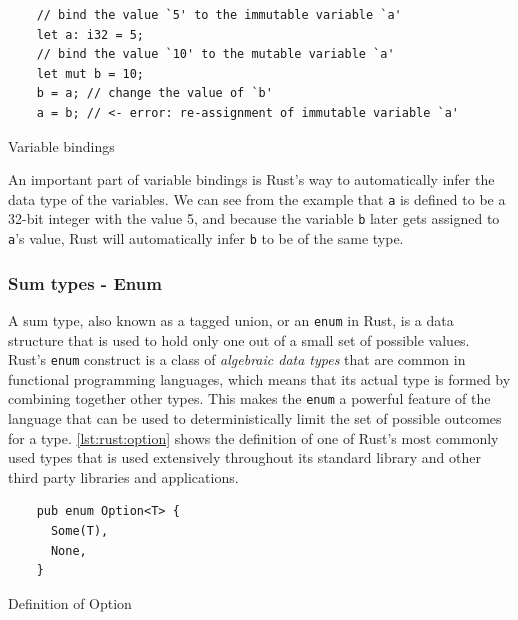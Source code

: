 \begin{listing}[H]
  \begin{verbatim}
    // bind the value `5' to the immutable variable `a'
    let a: i32 = 5;
    // bind the value `10' to the mutable variable `a'
    let mut b = 10;
    b = a; // change the value of `b'
    a = b; // <- error: re-assignment of immutable variable `a'
  \end{verbatim}
  \caption{Variable bindings}
  \label{lst:rust_variable_bindings}
\end{listing}

An important part of variable bindings is Rust's way to automatically infer the data type of the variables.
We can see from the example that \texttt{a} is defined to be a 32-bit integer with the value 5, and because the variable \texttt{b} later gets assigned to \texttt{a}'s value, Rust will automatically infer \texttt{b} to be of the same type.

\subsubsection{Sum types - Enum}

A sum type, also known as a tagged union, or an \texttt{enum} in Rust, is a data structure that is used to hold only one out of a small set of possible values.
Rust's \texttt{enum} construct is a class of \emph{algebraic data types} that are common in functional programming languages, which means that its actual type is formed by combining together other types.
This makes the \texttt{enum} a powerful feature of the language that can be used to deterministically limit the set of possible outcomes for a type.
\autoref{lst:rust:option} shows the definition of one of Rust's most commonly used types that is used extensively throughout its standard library and other third party libraries and applications.

\begin{listing}[H]
  \begin{verbatim}
    pub enum Option<T> {
      Some(T),
      None,
    }
  \end{verbatim}
  \caption{Definition of Option}
  \label{lst:rust:option}
\end{listing}

